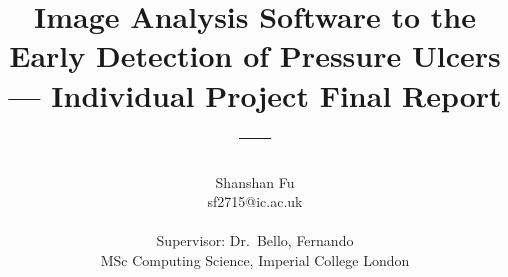 \title{Image Analysis Software to the Early Detection of Pressure Ulcers\\\Large{--- Individual Project Final Report ---}}
\author{Shanshan Fu \\
       sf2715@ic.ac.uk\\ \\
       \small{Supervisor: Dr.\ Bello, Fernando}\\
       \small{MSc Computing Science, Imperial College London}
}